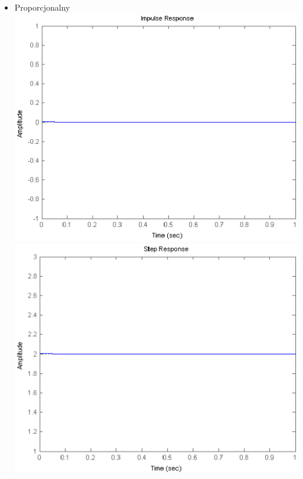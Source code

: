 \documentclass[a4paper,10pt]{article}
\begin{document}
\begin{itemize}
\item Proporcjonalny
\newline \includegraphics[scale=0.8]{CW1-proporcjonalny-impuls.eps}
\newline \includegraphics[scale=0.8]{CW1-proporcjonalny-skok.eps}
\end{itemize}
\end{document}
